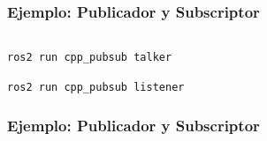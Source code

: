 \begin{frame}[fragile]
	\frametitle{Ejemplo: Publicador y Subscriptor}
    
    \begin{columns}
        \begin{column}{0.5\textwidth}
            
        \end{column}
        \begin{column}{0.5\textwidth}
            
        \end{column}
    \end{columns}
	
\begin{lstlisting}[style=bash,basicstyle=\footnotesize] 
ros2 run cpp_pubsub talker
\end{lstlisting}
\begin{lstlisting}[style=bash,basicstyle=\footnotesize] 
ros2 run cpp_pubsub listener
\end{lstlisting}
	
\end{frame}

\begin{frame}[fragile]
    \frametitle{Ejemplo: Publicador y Subscriptor}
    
    \begin{columns}
        \begin{column}{0.5\textwidth}
            
        \end{column}
        \begin{column}{0.5\textwidth}
            
        \end{column}
    \end{columns}
    
\end{frame}

